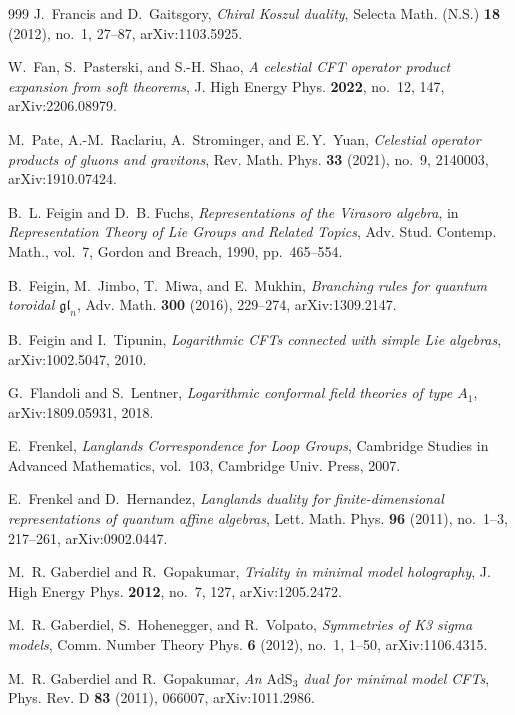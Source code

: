 \documentclass[11pt]{memoir}
\begin{document}
\begin{thebibliography}{999}
J.~Francis and D.~Gaitsgory, \emph{Chiral Koszul duality}, Selecta Math. (N.S.) \textbf{18} (2012), no.~1, 27--87, arXiv:1103.5925.

W.~Fan, S.~Pasterski, and S.-H. Shao, \emph{A celestial CFT operator product expansion from soft theorems}, J. High Energy Phys. \textbf{2022}, no.~12, 147, arXiv:2206.08979.

M.~Pate, A.-M.~Raclariu, A.~Strominger, and E.\,Y.~Yuan,
\emph{Celestial operator products of gluons and gravitons},
Rev. Math. Phys. \textbf{33} (2021), no.~9, 2140003,
arXiv:1910.07424.

B.~L. Feigin and D.~B. Fuchs, \emph{Representations of the Virasoro algebra}, in \emph{Representation Theory of Lie Groups and Related Topics}, Adv. Stud. Contemp. Math., vol.~7, Gordon and Breach, 1990, pp.~465--554.

B.~Feigin, M.~Jimbo, T.~Miwa, and E.~Mukhin, \emph{Branching rules for quantum toroidal $\mathfrak{gl}_n$}, Adv. Math. \textbf{300} (2016), 229--274, arXiv:1309.2147.

B.~Feigin and I.~Tipunin, \emph{Logarithmic CFTs connected with simple Lie algebras}, arXiv:1002.5047, 2010.

G.~Flandoli and S.~Lentner, \emph{Logarithmic conformal field theories of type $A_1$}, arXiv:1809.05931, 2018.

E.~Frenkel, \emph{Langlands Correspondence for Loop Groups}, Cambridge Studies in Advanced Mathematics, vol.~103, Cambridge Univ. Press, 2007.

E.~Frenkel and D.~Hernandez, \emph{Langlands duality for finite-dimensional representations of quantum affine algebras}, Lett. Math. Phys. \textbf{96} (2011), no.~1--3, 217--261, arXiv:0902.0447.

M.~R. Gaberdiel and R.~Gopakumar, \emph{Triality in minimal model holography}, J. High Energy Phys. \textbf{2012}, no.~7, 127, arXiv:1205.2472.

M.~R. Gaberdiel, S.~Hohenegger, and R.~Volpato, \emph{Symmetries of K3 sigma models}, Comm. Number Theory Phys. \textbf{6} (2012), no.~1, 1--50, arXiv:1106.4315.

M.~R. Gaberdiel and R.~Gopakumar, \emph{An $\mathrm{AdS}_3$ dual for minimal model CFTs}, Phys. Rev. D \textbf{83} (2011), 066007, arXiv:1011.2986.


\end{thebibliography}
\end{document}
